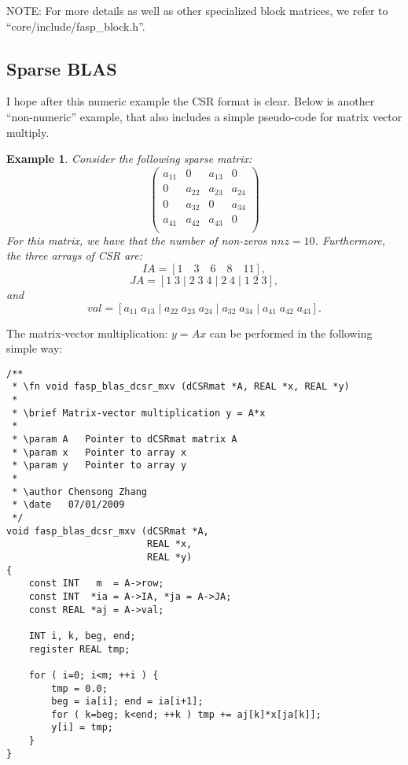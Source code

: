 \documentclass[11pt]{memoir}
\newtheorem{example}[theorem]{Example}
\begin{document}
\begin{snugshade}\noindent
NOTE: For more details as well as other specialized block matrices, we refer to ``core/include/fasp\_block.h''.
\end{snugshade}


\subsection{Sparse BLAS}

I hope after this numeric example the CSR format is clear. Below is
another ``non-numeric'' example, that also includes a simple pseudo-code for
matrix vector multiply.

\begin{example} Consider the following sparse matrix:
$$
\left(
\begin{array}{cccc}
a_{11} & 0 & a_{13} & 0 \\
0 & a_{22} & a_{23} & a_{24} \\
0 & a_{32} & 0 & a_{34} \\
a_{41}& a_{42} & a_{43} & 0 \\
\end{array}
\right)
$$
For this matrix, we have that the number of non-zeros $nnz=10$. Furthermore, the three arrays of CSR are:
$$
IA = [ 1\quad 3 \quad 6 \quad 8 \quad 11], 
$$
$$
JA = [ 1\; 3 \;|\; 2 \; 3\; 4 \;|\; 2 \; 4 \;|\; 1 \; 2 \; 3],
$$
and 
$$
val = [a_{11} \; a_{13}\;|\; a_{22} \; a_{23} \; a_{24}\;|\; a_{32} \; a_{34}\;|\; a_{41}\; a_{42}\; a_{43}].
$$
\end{example}
%
The matrix-vector multiplication: $y=Ax$ can be performed in the
following simple way:

\begin{lstlisting}
/**
 * \fn void fasp_blas_dcsr_mxv (dCSRmat *A, REAL *x, REAL *y) 
 *
 * \brief Matrix-vector multiplication y = A*x
 *
 * \param A   Pointer to dCSRmat matrix A
 * \param x   Pointer to array x
 * \param y   Pointer to array y
 *
 * \author Chensong Zhang
 * \date   07/01/2009
 */
void fasp_blas_dcsr_mxv (dCSRmat *A, 
                         REAL *x, 
                         REAL *y)
{
    const INT   m  = A->row;
    const INT  *ia = A->IA, *ja = A->JA;
    const REAL *aj = A->val;
    
    INT i, k, beg, end;    
    register REAL tmp;
    
    for ( i=0; i<m; ++i ) {
        tmp = 0.0; 
        beg = ia[i]; end = ia[i+1]; 
        for ( k=beg; k<end; ++k ) tmp += aj[k]*x[ja[k]];
        y[i] = tmp;
    }
}
\end{lstlisting}
\end{document}
